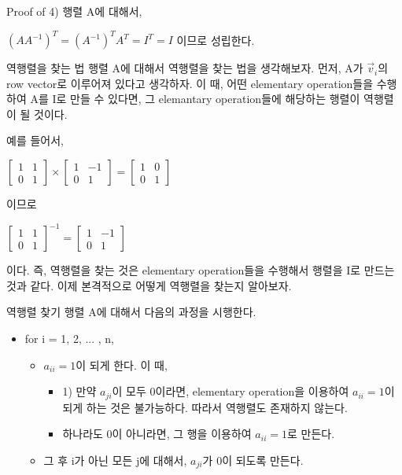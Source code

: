 \documentclass{beamer}
\begin{document}
\begin{frame}{Proof of 4)} 
행렬 A에 대해서, 

$(A A^{-1})^T = (A^{-1})^T A^T  = I^T = I$ 이므로 성립한다. 
\end{frame}


\begin{frame}{역행렬을 찾는 법}
행렬 A에 대해서 역행렬을 찾는 법을 생각해보자. 먼저, A가 $\vec{v}_i$의 row vector로 이루어져 있다고 생각하자. 이 때, 어떤 elementary operation들을 수행하여 A를 I로 만들 수 있다면, 그 elemantary operation들에 해당하는 행렬이 역행렬이 될 것이다.  

예를 들어서, 

$
\left[ \begin{matrix}
1 & 1  \\
0 & 1 
\end{matrix} \right] \times
\left[ \begin{matrix}
1 & -1  \\
0 & 1 
\end{matrix} \right] =
\left[ \begin{matrix}
1 & 0  \\
0 & 1 
\end{matrix} \right] $ 

이므로 



$\left[ \begin{matrix}
1 & 1  \\
0 & 1 
\end{matrix} \right] ^{-1} = 
\left[ \begin{matrix}
1 & -1  \\
0 & 1 
\end{matrix} \right] $

이다. 즉, 역행렬을 찾는 것은 elementary operation들을 수행해서 행렬을 I로 만드는 것과 같다. 이제 본격적으로 어떻게 역행렬을 찾는지 알아보자. 

\end{frame}

\begin{frame}{역행렬 찾기} 
행렬 A에 대해서 다음의 과정을 시행한다. 
\begin{itemize} 
\item for i = 1, 2, ... , n, 
\begin{itemize}
\item $a_{ii} = 1$이 되게 한다. 이 때, 
\begin{itemize} 
\item 1) 만약 $a_{ji}$이 모두 0이라면, elementary operation을 이용하여 $a_{ii} = 1$이 되게 하는 것은 불가능하다. 따라서 역행렬도 존재하지 않는다. 
\item 하나라도 0이 아니라면, 그 행을 이용하여 $a_{ii} = 1$로 만든다. 
\end{itemize}
\item 그 후 i가 아닌 모든 j에 대해서, $a_{ji}$가 0이 되도록 만든다. 
\end{itemize}
\end{itemize}

\end{frame}
\end{document}
